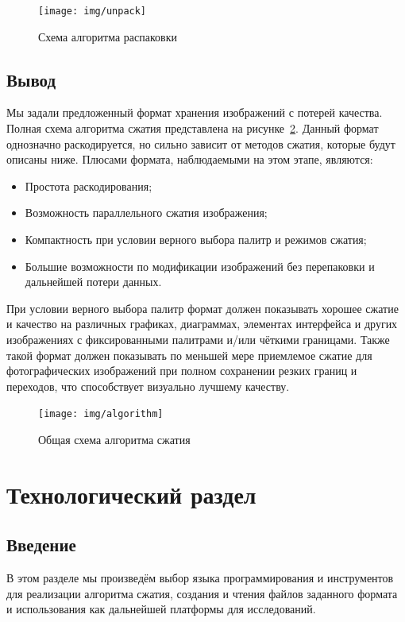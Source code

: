 \documentclass[a4paper,12pt]{article}
\numberwithin{equation}{section}
\begin{document}
\begin{figure}
  \texttt{[image: img/unpack]}
  \caption{Схема алгоритма распаковки}
  \label{fig:unpack}
\end{figure}

\subsection{Вывод}

Мы задали предложенный формат хранения изображений с потерей качества. Полная
схема алгоритма сжатия представлена на рисунке~\ref{fig:algorithm}. Данный
формат однозначно раскодируется, но сильно зависит от методов сжатия, которые
будут описаны ниже. Плюсами формата, наблюдаемыми на этом этапе, являются:

\begin{itemize}
\item Простота раскодирования;
\item Возможность параллельного сжатия изображения;
\item Компактность при условии верного выбора палитр и режимов сжатия;
\item Большие возможности по модификации изображений без перепаковки и
  дальнейшей потери данных.
\end{itemize}

При условии верного выбора палитр формат должен показывать хорошее сжатие и
качество на различных графиках, диаграммах, элементах интерфейса и других
изображениях с фиксированными палитрами и/или чёткими границами. Также такой
формат должен показывать по меньшей мере приемлемое сжатие для фотографических
изображений при полном сохранении резких границ и переходов, что способствует
визуально лучшему качеству.

\begin{figure}
  \texttt{[image: img/algorithm]}
  \caption{Общая схема алгоритма сжатия}
  \label{fig:algorithm}
\end{figure}

\section{Технологический раздел}

\subsection{Введение}

В этом разделе мы произведём выбор языка программирования и инструментов для
реализации алгоритма сжатия, создания и чтения файлов заданного формата и
использования как дальнейшей платформы для исследований.
\end{document}

